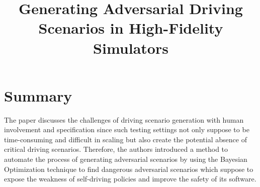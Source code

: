 \documentclass[10pt,a4paper]{report}
\title{Generating Adversarial Driving Scenarios in High-Fidelity Simulators}
\begin{document}
\begin{center}
\textbf{\thetitle}
\end{center}


\section{Summary}
The paper discusses the challenges of driving scenario generation with human involvement and specification since such testing settings not only suppose to be time-consuming and difficult in scaling but also create the potential absence of critical driving scenarios.
%
Therefore, the authors introduced a method to automate the process of generating adversarial scenarios by using the Bayesian Optimization technique to find dangerous adversarial scenarios which suppose to expose the weakness of self-driving policies and improve the safety of its software.
%
\end{document}
